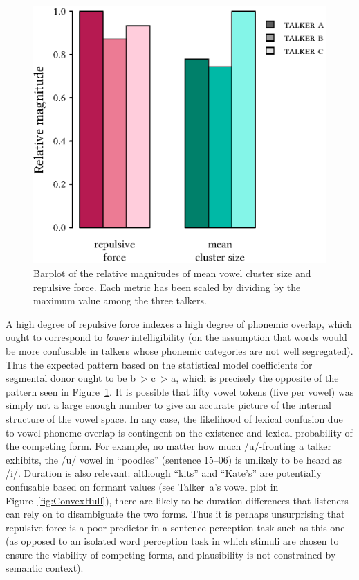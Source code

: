 \begin{figure}[bt]
	\begin{centering}
	\includegraphics{figures/posthocs/ForceCluster.eps}
	\caption[Barplot of vowel overlap and encroachment metrics]{Barplot of the relative magnitudes of mean vowel cluster size and repulsive force.  Each metric has been scaled by dividing by the maximum value among the three talkers.\label{fig:ForceCluster}}
	\end{centering}
\end{figure}

A high degree of repulsive force indexes a high degree of phonemic overlap, which ought to correspond to \emph{lower} intelligibility (on the assumption that words would be more confusable in talkers whose phonemic categories are not well segregated).  Thus the expected pattern based on the statistical model coefficients for segmental donor ought to be \ac{b}~> \ac{c}~> \ac{a}, which is precisely the opposite of the pattern seen in Figure~\ref{fig:ForceCluster}.  It is possible that fifty vowel tokens (five per vowel) was simply not a large enough number to give an accurate picture of the internal structure of the vowel space.  In any case, the likelihood of lexical confusion due to vowel phoneme overlap is contingent on the existence and lexical probability of the competing form.  For example, no matter how much /u/-fronting a talker exhibits, the /u/ vowel in “poodles” (sentence 15–06) is unlikely to be heard as /i/.  Duration is also relevant: although “kits” and “Kate’s” are potentially confusable based on formant values (see Talker~\ac{a}’s vowel plot in Figure~\ref{fig:ConvexHull}), there are likely to be duration differences that listeners can rely on to disambiguate the two forms.  Thus it is perhaps unsurprising that repulsive force is a poor predictor in a sentence perception task such as this one (as opposed to an isolated word perception task in which stimuli are chosen to ensure the viability of competing forms, and plausibility is not constrained by semantic context).

